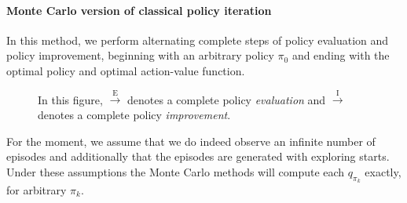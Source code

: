 \documentclass[12pt]{article}
\begin{document}
\paragraph{Monte Carlo version of classical policy iteration} In this method, we perform alternating complete steps of policy evaluation and policy improvement, beginning with an arbitrary policy $\pi_0$ and ending with the optimal policy and optimal action-value function.
\begin{figure}[h]
  \centering
  \caption{\footnotesize In this figure, $\overset{\textrm{E}}{\longrightarrow}$ denotes a complete policy \emph{evaluation} and $\overset{\textrm{I}}{\longrightarrow}$ denotes a complete policy \emph{improvement}.}
\end{figure}

For the moment, we assume that we do indeed observe an infinite number of episodes and additionally that the episodes are generated with exploring starts. Under these assumptions the Monte Carlo methods will compute each $q_{\pi_k}$ exactly, for arbitrary $\pi_k$.
\end{document}
